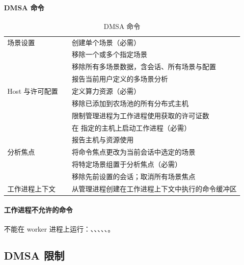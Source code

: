\paragraph{DMSA 命令}
\begin{table}[htbp]
\centering
\caption{DMSA 命令}
\small
\begin{tabular}{|L{2.8cm}|L{3.5cm}|L{6.5cm}|}
\hline
{} &  &  \\
\hline
场景设置 &  & 创建单个场景（必需） \\
 &  & 移除一个或多个指定场景 \\
 &  & 移除所有多场景数据，含会话、所有场景与配置 \\
 &  & 报告当前用户定义的多场景分析 \\
Host 与许可配置 &  & 定义算力资源（必需） \\
 &  & 移除已添加到农场池的所有分布式主机 \\
 &  & 限制管理进程为工作进程使用获取的许可证数 \\
 &  & 在  指定的主机上启动工作进程（必需） \\
 &  & 报告主机与资源使用 \\
分析焦点 &  & 将命令焦点更改为当前会话中选定的场景 \\
 &  & 将特定场景组置于分析焦点（必需） \\
 &  & 移除先前设置的会话；取消所有场景焦点 \\
工作进程上下文 &  & 从管理进程创建在工作进程上下文中执行的命令缓冲区 \\
\hline
\end{tabular}
\end{table}

\paragraph{工作进程不允许的命令}
不能在 worker 进程上运行：、、、、、。

\subsection{DMSA 限制}
